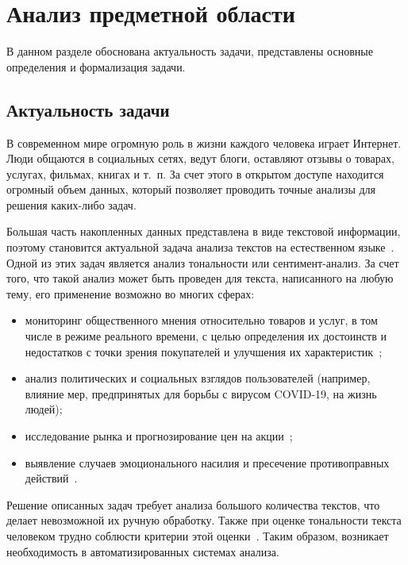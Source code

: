 \chapter{Анализ предметной области}

В данном разделе обоснована актуальность задачи, представлены основные
определения и формализация задачи.

\section{Актуальность задачи}

В современном мире огромную роль в жизни каждого человека играет Интернет.
Люди общаются в социальных сетях, ведут блоги, оставляют отзывы о товарах,
услугах, фильмах, книгах и т.~п. За счет этого в открытом доступе находится
огромный объем данных, который позволяет проводить точные анализы для
решения каких-либо задач.  

Большая часть накопленных данных представлена в виде текстовой информации,
поэтому становится актуальной задача анализа текстов на естественном
языке~\cite{article01}. Одной из этих задач является анализ тональности или
сентимент-анализ. За счет того, что такой анализ может быть проведен для текста,
написанного на любую тему, его применение возможно во многих сферах:
\begin{itemize}
    \item мониторинг общественного мнения относительно товаров
        и услуг, в том числе в режиме реального времени, с целью определения их
        достоинств и недостатков с точки зрения покупателей и улучшения их
        характеристик~\cite{article02};
    \item анализ политических и социальных взглядов пользователей (например,
        влияние мер, предпринятых для борьбы с вирусом COVID-19, на жизнь
        людей);
    \item исследование рынка и прогнозирование цен на акции~\cite{article03};
    \item выявление случаев эмоционального насилия и пресечение
        противоправных действий~\cite{article04}.
\end{itemize}

Решение описанных задач требует анализа большого количества текстов, что делает
невозможной их ручную обработку. Также при оценке тональности текста человеком
трудно соблюсти критерии этой оценки~\cite{article02}. Таким образом, возникает
необходимость в автоматизированных системах анализа.

